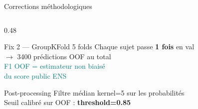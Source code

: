 \documentclass[aspectratio=169, 10pt]{beamer}
\begin{document}
\begin{frame}{Corrections méthodologiques}
\begin{columns}[T]
\begin{column}{0.48\textwidth}
\begin{block}{\small Fix 2 — GroupKFold 5 folds}
                Chaque sujet passe \textbf{1 fois} en val\\
                $\to$ 3400 prédictions OOF au total\\[3pt]
                \textcolor{Teal}{F1 OOF = estimateur non biaisé}\\
                \textcolor{Teal}{du score public ENS}
            \end{block}
            \vspace{0.15cm}
            \begin{block}{\small Post-processing}
                \small Filtre médian kernel=5 sur les probabilités\\
                Seuil calibré sur OOF : \textbf{threshold=0.85}
            \end{block}
        \end{column}
    \end{columns}
\end{frame}
\end{document}
